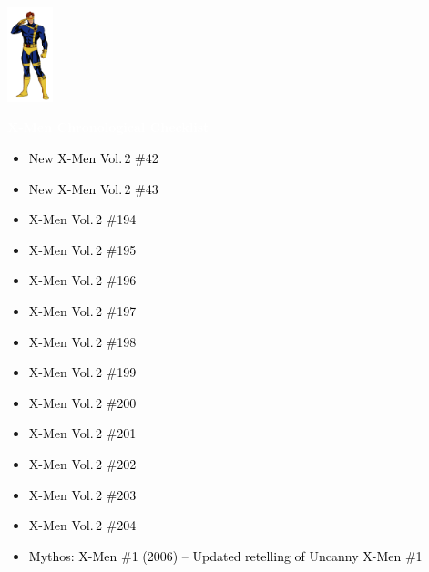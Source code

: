 \documentclass[12pt]{article}
\newcommand{\checkbox}{\raisebox{0.0ex}{\fbox{\rule{0ex}{1.5ex} \rule{1.5ex}{0ex}}}}
\begin{document}
\begin{center}
    \vspace*{2cm}
    \includegraphics[width=0.1\textwidth]{cyclops.png}
    \vspace{0.3cm}

    {\Huge \textbf{\textcolor{white}{X-Men Chronological Checklist}}}
\end{center}

\vspace{0.3cm}
\noindent
\begin{tcolorbox}[
  colback=white!95!gray,
  colframe=black,
  width=\textwidth,
  arc=4mm,
  auto outer arc,
  boxrule=0.8pt,
  left=8pt,right=8pt,top=8pt,bottom=8pt
]
\begin{itemize}[left=0pt,label={\checkbox}]
  \item \textcolor{black}{New X-Men Vol.\,2 \#42}
  \item \textcolor{black}{New X-Men Vol.\,2 \#43}
  \item \textcolor{black}{X-Men Vol.\,2 \#194}
  \item \textcolor{black}{X-Men Vol.\,2 \#195}
  \item \textcolor{black}{X-Men Vol.\,2 \#196}
  \item \textcolor{black}{X-Men Vol.\,2 \#197}
  \item \textcolor{black}{X-Men Vol.\,2 \#198}
  \item \textcolor{black}{X-Men Vol.\,2 \#199}
  \item \textcolor{black}{X-Men Vol.\,2 \#200}
  \item \textcolor{black}{X-Men Vol.\,2 \#201}
  \item \textcolor{black}{X-Men Vol.\,2 \#202}
  \item \textcolor{black}{X-Men Vol.\,2 \#203}
  \item \textcolor{black}{X-Men Vol.\,2 \#204}
  \item \textcolor{black}{Mythos: X-Men \#1 (2006) – Updated retelling of Uncanny X-Men \#1}
\end{itemize}
\end{tcolorbox}
\end{document}
